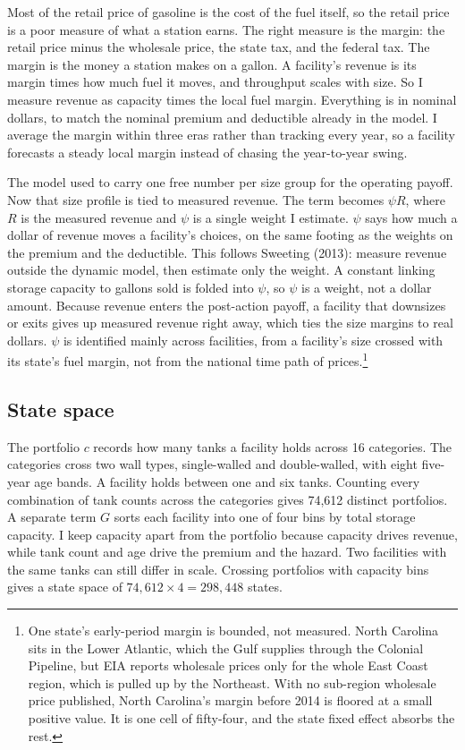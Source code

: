 \documentclass[
  12pt,
]{article}
\begin{document}
Most of the retail price of gasoline is the cost of the fuel itself, so
the retail price is a poor measure of what a station earns. The right
measure is the margin: the retail price minus the wholesale price, the
state tax, and the federal tax. The margin is the money a station makes
on a gallon. A facility's revenue is its margin times how much fuel it
moves, and throughput scales with size. So I measure revenue as capacity
times the local fuel margin. Everything is in nominal dollars, to match
the nominal premium and deductible already in the model. I average the
margin within three eras rather than tracking every year, so a facility
forecasts a steady local margin instead of chasing the year-to-year
swing.

The model used to carry one free number per size group for the operating
payoff. Now that size profile is tied to measured revenue. The term
becomes \(\psi R\), where \(R\) is the measured revenue and \(\psi\) is
a single weight I estimate. \(\psi\) says how much a dollar of revenue
moves a facility's choices, on the same footing as the weights on the
premium and the deductible. This follows Sweeting (2013): measure
revenue outside the dynamic model, then estimate only the weight. A
constant linking storage capacity to gallons sold is folded into
\(\psi\), so \(\psi\) is a weight, not a dollar amount. Because revenue
enters the post-action payoff, a facility that downsizes or exits gives
up measured revenue right away, which ties the size margins to real
dollars. \(\psi\) is identified mainly across facilities, from a
facility's size crossed with its state's fuel margin, not from the
national time path of prices.\footnote{One state's early-period margin
  is bounded, not measured. North Carolina sits in the Lower Atlantic,
  which the Gulf supplies through the Colonial Pipeline, but EIA reports
  wholesale prices only for the whole East Coast region, which is pulled
  up by the Northeast. With no sub-region wholesale price published,
  North Carolina's margin before 2014 is floored at a small positive
  value. It is one cell of fifty-four, and the state fixed effect
  absorbs the rest.}

\subsection{State space}\label{state-space}

The portfolio \(c\) records how many tanks a facility holds across 16
categories. The categories cross two wall types, single-walled and
double-walled, with eight five-year age bands. A facility holds between
one and six tanks. Counting every combination of tank counts across the
categories gives 74,612 distinct portfolios. A separate term \(G\) sorts
each facility into one of four bins by total storage capacity. I keep
capacity apart from the portfolio because capacity drives revenue, while
tank count and age drive the premium and the hazard. Two facilities with
the same tanks can still differ in scale. Crossing portfolios with
capacity bins gives a state space of \(74{,}612 \times 4 = 298{,}448\)
states.
\end{document}
